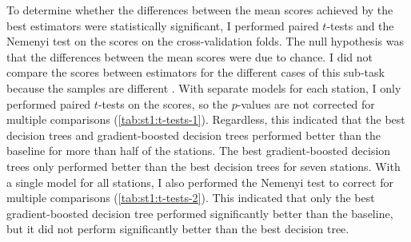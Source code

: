 \documentclass[11pt]{extarticle}
\begin{document}
To determine whether the differences between the mean scores achieved by the best
estimators were statistically significant, I performed paired $t$-tests and the Nemenyi
test on the scores on the cross-validation folds.
The null hypothesis was that the differences between the mean scores were due to
chance.
I did not compare the scores between estimators for the different cases of this
sub-task because the samples are different \parencite[354]{Flach2012}.
With separate models for each station, I only performed paired $t$-tests on the scores,
so the $p$-values are not corrected for multiple comparisons
(\cref{tab:st1:t-tests-1}).
Regardless, this indicated that the best decision trees and gradient-boosted decision
trees performed better than the baseline for more than half of the stations.
The best gradient-boosted decision trees only performed better than the best decision
trees for seven stations.
With a single model for all stations, I also performed the Nemenyi test to correct for
multiple comparisons (\cref{tab:st1:t-tests-2}).
This indicated that only the best gradient-boosted decision tree performed
significantly better than the baseline, but it did not perform significantly better
than the best decision tree.

\end{document}
